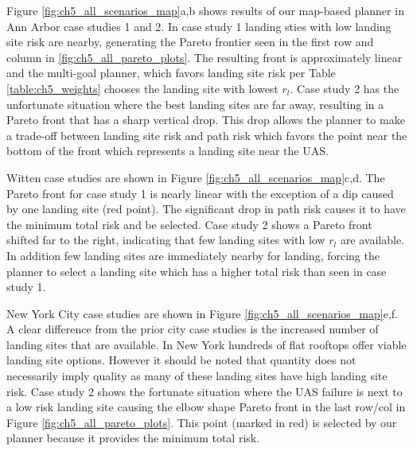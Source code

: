 Figure \ref{fig:ch5_all_scenarios_map}a,b shows results of our map-based planner in Ann Arbor case studies 1 and 2. In case study 1 landing sties with low landing site risk are nearby, generating the Pareto frontier seen in the first row and column in \ref{fig:ch5_all_pareto_plots}. The resulting front is approximately linear and the multi-goal planner, which favors landing site risk per Table \ref{table:ch5_weights} chooses the landing site with lowest $r_l$. Case study 2 has the unfortunate situation where the best landing sites are far away, resulting in a Pareto front that has a sharp vertical drop. This drop allows the planner to make a trade-off between landing site risk and path risk which favors the point near the bottom of the front which represents a landing site near the UAS.

Witten case studies are shown in Figure \ref{fig:ch5_all_scenarios_map}c,d.   The Pareto front for case study 1 is nearly linear with the exception of a dip caused by one landing site (red point). The significant drop in path risk causes it to have the minimum total risk and be selected. Case study 2 shows a Pareto front shifted far to the right, indicating that few landing sites with low $r_l$ are available. In addition few landing sites are immediately nearby for landing, forcing the planner to select a landing site which has a higher total risk than seen in case study 1.

New York City case studies are shown in Figure \ref{fig:ch5_all_scenarios_map}e,f. A clear difference from the prior city case studies is the increased number of landing sites that are available. In New York hundreds of flat rooftops offer viable landing site options. However it should be noted that quantity does not necessarily imply quality as many of these landing sites have high landing site risk. Case study 2 shows the fortunate situation where the UAS failure is next to a low risk landing site causing the elbow shape Pareto front in the last row/col in Figure \ref{fig:ch5_all_pareto_plots}. This point (marked in red) is selected by our planner because it provides the minimum total risk.



